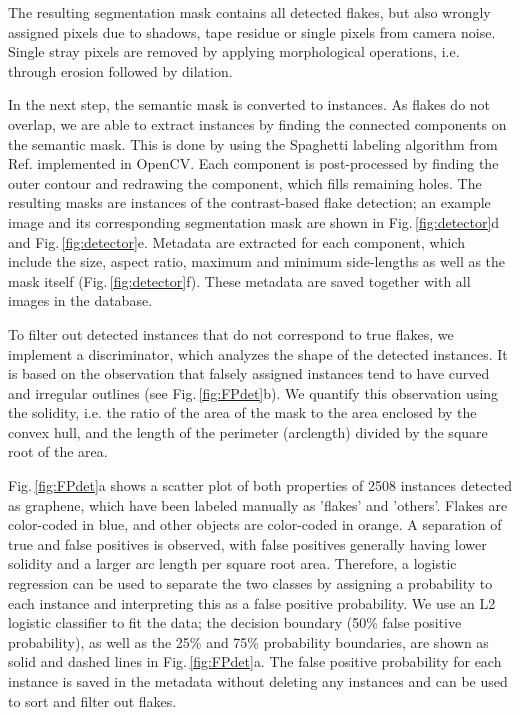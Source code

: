 \documentclass[reprint, prl, superscriptaddress, floatfix]{revtex4-2}
\newcommand{\fig}[1]{Fig.\,\ref{#1}}
\begin{document}
The resulting segmentation mask contains all detected flakes, but also wrongly assigned pixels due to shadows, tape residue or single pixels from camera noise.
Single stray pixels are removed by applying morphological operations, i.e. through erosion followed by dilation.

In the next step, the semantic mask is converted to instances.
As flakes do not overlap, we are able to extract instances by finding the connected components on the semantic mask.
This is done by using the Spaghetti labeling algorithm from Ref.\cite{Bolelli} implemented in OpenCV. 
Each component is post-processed by finding the outer contour and redrawing the component, which fills remaining holes.
The resulting masks are instances of the contrast-based flake detection; an example image and its corresponding segmentation mask are shown in \fig{fig:detector}d and \fig{fig:detector}e.
Metadata are extracted for each component, which include the size, aspect ratio, maximum and minimum side-lengths as well as the mask itself (\fig{fig:detector}f). 
These metadata are saved together with all images in the database. 

To filter out detected instances that do not correspond to true flakes, we implement a discriminator, which analyzes the shape of the detected instances.
It is based on the observation that falsely assigned instances tend to have curved and irregular outlines (see \fig{fig:FPdet}b). 
We quantify this observation using the solidity, i.e. the ratio of the area of the mask to the area enclosed by the convex hull, and the length of the perimeter (arclength) divided by the square root of the area.

\fig{fig:FPdet}a shows a scatter plot of both properties of 2508 instances detected as graphene, which have been labeled manually as 'flakes' and 'others'.
Flakes are color-coded in blue, and other objects are color-coded in orange. 
A separation of true and false positives is observed, with false positives generally having lower solidity and a larger arc length per square root area. 
Therefore, a logistic regression can be used to separate the two classes by assigning a probability to each instance and interpreting this as a false positive probability.
We use an L2 logistic classifier to fit the data; the decision boundary (50\% false positive probability), as well as the 25\% and 75\% probability boundaries, are shown as solid and dashed lines in \fig{fig:FPdet}a. 
The false positive probability for each instance is saved in the metadata without deleting any instances and can be used to sort and filter out flakes. 
\end{document}
